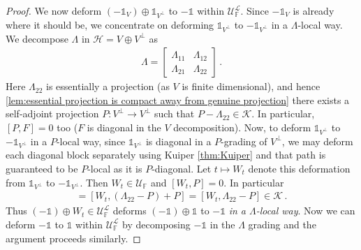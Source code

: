 \documentclass[a4paper,10pt]{article}
\numberwithin{equation}{section}
\theoremstyle{plain}
\theoremstyle{plain}
\theoremstyle{plain}
\theoremstyle{plain}
\theoremstyle{plain}
\theoremstyle{remark}
\theoremstyle{definition}
\theoremstyle{plain}
\newcommand{\FF}{\mathbb{F}}
\newcommand{\calU}{\mathcal{U}}
\newcommand{\calH}{\mathcal{H}}
\newcommand{\calK}{\mathcal{K}}
\newcommand{\calL}{\mathcal{L}}
\newcommand{\Id}{\mathds{1}}
\newcommand{\eq}[1]{\begin{align*}#1\end{align*}}
\begin{document}
\begin{proof}
		We now deform $(-\Id_V)\oplus \Id_{V^\perp} $ to $-\Id$ within $\calU_\FF^\calL$. Since $-\Id_V$ is already where it should be, we concentrate on deforming $\Id_{V^\perp}$ to $-\Id_{V^\perp}$ in a $\Lambda$-local way. We decompose $\Lambda$ in $\calH=V\oplus V^\perp$ as 
		\eq{\Lambda=\begin{bmatrix}\Lambda_{11} & \Lambda_{12} \\ \Lambda_{21} & \Lambda_{22}\end{bmatrix}\,.} 
		Here $\Lambda_{22}$ is essentially a projection (as $V$ is finite dimensional), and hence \cref{lem:essential projection is compact away from genuine projection} there exists a self-adjoint projection $P:V^\perp\to V^\perp$ such that $P-\Lambda_{22}\in\calK$. In particular, $[P,F]=0$ too ($F$ is diagonal in the $V$ decomposition). Now, to deform $\Id_{V^\perp}$ to $-\Id_{V^\perp}$ in a $P$-local way, since $\Id_{V^\perp}$ is diagonal in a $P$-grading of $V^\perp$, we may deform each diagonal block separately using Kuiper \cref{thm:Kuiper} and that path is guaranteed to be $P$-local as it is $P$-diagonal. Let $t\mapsto W_t$ denote this deformation from $\Id_{V^\perp}$ to $-\Id_{V^\perp}$. Then $W_t\in\calU_\FF$ and $[W_t,P]=0$. In particular \eq{[W_t,\Lambda_{22}]=[W_t,(\Lambda_{22}-P)+P]=[W_t,\Lambda_{22}-P]\in\calK\,.} 
		Thus $(-\Id)\oplus W_t \in \calU_\FF^\calL$ deforms $(-\Id)\oplus \Id$ to $-\Id$ \emph{in a $\Lambda$-local way}. Now we can deform $-\Id$ to $\Id$ within $\calU_\FF^\calL$ by decomposing $-\Id$ in the $\Lambda$ grading and the argument proceeds similarly.
	\end{proof}
	
\end{document}

